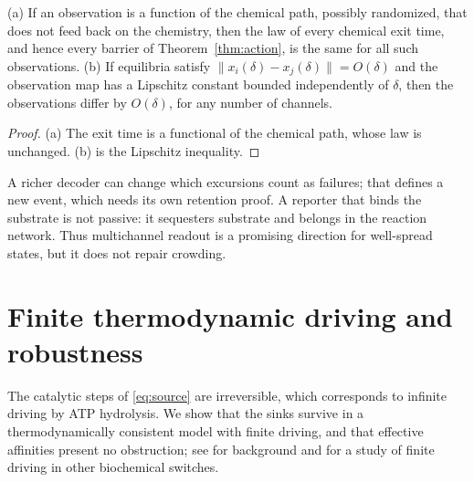 \begin{proposition}\label{prop:passive}
\textup{(a)} If an observation is a function of the chemical path, possibly randomized, that
does not feed back on the chemistry, then the law of every chemical exit time, and hence every
barrier of Theorem~\textup{\ref{thm:action}}, is the same for all such observations.
\textup{(b)} If equilibria satisfy \(\|x_i(\delta)-x_j(\delta)\|=O(\delta)\) and the
observation map has a Lipschitz constant bounded independently of \(\delta\), then the
observations differ by \(O(\delta)\), for any number of channels.
\end{proposition}
\begin{proof}
(a) The exit time is a functional of the chemical path, whose law is unchanged. (b) is the
Lipschitz inequality.
\end{proof}
A richer decoder can change which excursions count as failures; that defines a new event, which
needs its own retention proof. A reporter that binds the substrate is not passive: it
sequesters substrate and belongs in the reaction network. Thus multichannel readout is a
promising direction for well-spread states, but it does not repair crowding.

\section{Finite thermodynamic driving and robustness}\label{sec:driving}
The catalytic steps of \eqref{eq:source} are irreversible, which corresponds to infinite
driving by ATP hydrolysis. We show that the sinks survive in a thermodynamically consistent
model with finite driving, and that effective affinities present no obstruction; see
\cite{Hill1989,Qian2007,RaoEsposito2016} for background and \cite{LiLiaoOuyangLi2024} for a
study of finite driving in other biochemical switches.

